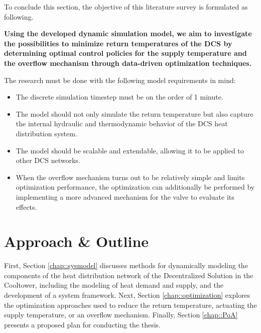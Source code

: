 To conclude this section, the objective of this literature survey is formulated as following.

{\centering
\textbf{ Using the developed dynamic simulation model, we aim to investigate the possibilities to minimize return temperatures of the DCS by determining optimal control policies for the supply temperature and the overflow mechanism through data-driven optimization techniques.}\par
}

The research must be done with the following model requirements in mind:
\begin{itemize}
    \item The discrete simulation timestep must be on the order of 1 minute. 
    \item The model should not only simulate the return temperature but also capture the internal hydraulic and thermodynamic behavior of the DCS heat distribution system.
    \item The model should be scalable and extendable, allowing it to be applied to other DCS networks.
    \item When the overflow mechanism turns out to be relatively simple and limits optimization performance, the optimization can additionally be performed by implementing a more advanced mechanism for the valve to evaluate its effects.
\end{itemize}

\section{Approach \& Outline}
First, Section \ref{chap::sysmodel} discusses methods for dynamically modeling the components of the heat distribution network of the Decentralized Solution in the Cooltower, including the modeling of heat demand and supply, and the development of a system framework. Next, Section \ref{chap::optimization} explores the optimization approaches used to reduce the return temperature, actuating the supply temperature, or an overflow mechanism. Finally, Section \ref{chap::PoA} presents a proposed plan for conducting the thesis.



